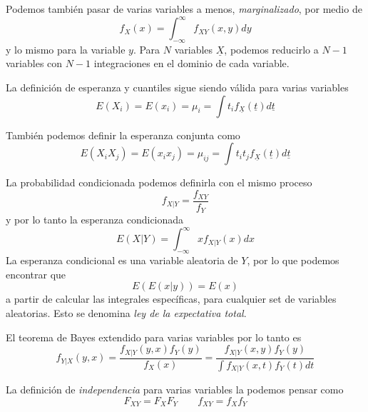 \documentclass{article}
\numberwithin{equation}{section} %
\begin{document}
Podemos también pasar de varias variables a menos, \emph{marginalizado}, por medio de
\begin{equation}
f_X(x) = \int_{-\infty}^{\infty} f_{XY}(x,y) dy
\end{equation}
y lo mismo para la variable $y$. Para $N$ variables $\underline{X}$, podemos reducirlo a $N-1$ variables con $N-1$ integraciones en el dominio de cada variable.

La definición de esperanza y cuantiles sigue siendo válida para varias variables
\begin{equation}
E(X_i) = E(x_i) = \mu_i = \int t_i f_{\underline{X}}(\underline{t}) d\underline{t}
\end{equation}

También podemos definir la esperanza conjunta como
\begin{equation}
E(X_i X_j) = E(x_i x_j) = \mu_{ij} = \int t_i t_j f_{\underline{X}}(\underline{t}) d\underline{t}
\end{equation}

La probabilidad condicionada podemos definirla con el mismo proceso
\begin{equation}
f_{X|Y} = \frac{f_{XY}}{f_{Y}}
\end{equation}
y por lo tanto la esperanza condicionada
\begin{equation}
E(X|Y) = \int_{-\infty}^{\infty} x f_{X|Y}(x) dx
\end{equation}
La esperanza condicional es una variable aleatoria de $Y$, por lo que podemos encontrar que
\begin{equation}
E(E(x|y)) = E(x)
\end{equation}
a partir de calcular las integrales específicas, para cualquier set de variables aleatorias. Esto se denomina \emph{ley de la expectativa total}.

El teorema de Bayes extendido para varias variables por lo tanto es
\begin{equation}
f_{Y|X}(y, x) = \frac{f_{X|Y}(y, x) f_Y(y)}{f_{X}(x)} = \frac{ f_{X|Y}(x,y) f_Y(y)}{\int f_{X|Y}(x, t) f_Y(t) dt}
\end{equation}

La definición de \emph{independencia} para varias variables la podemos pensar como
\begin{equation}
F_{XY} = F_{X} F_{Y} \qquad f_{XY} = f_X f_Y
\end{equation}
\end{document}
